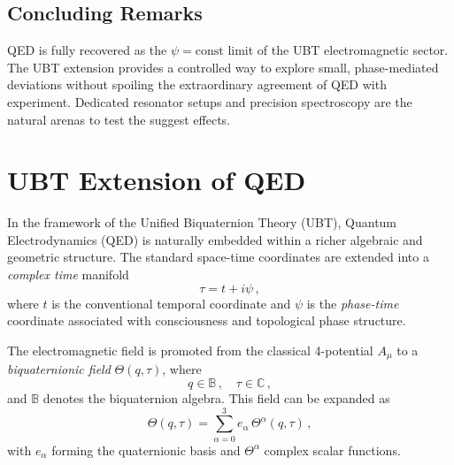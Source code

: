 \subsection*{Concluding Remarks}
QED is fully recovered as the $\psi=\mathrm{const}$ limit of the UBT electromagnetic sector. The UBT extension provides a controlled way to explore small, phase-mediated deviations without spoiling the extraordinary agreement of QED with experiment. Dedicated resonator setups and precision spectroscopy are the natural arenas to test the suggest effects.

\section{UBT Extension of QED}

In the framework of the Unified Biquaternion Theory (UBT), Quantum Electrodynamics (QED) is naturally embedded within a richer algebraic and geometric structure. The standard space-time coordinates are extended into a \emph{complex time} manifold
\begin{equation}
\tau = t + i \psi \,,
\end{equation}
where \(t\) is the conventional temporal coordinate and \(\psi\) is the \emph{phase-time} coordinate associated with consciousness and topological phase structure.  

The electromagnetic field is promoted from the classical 4-potential \(A_\mu\) to a \emph{biquaternionic field} \(\Theta(q,\tau)\), where
\begin{equation}
q \in \mathbb{B} \,, \quad \tau \in \mathbb{C} \,,
\end{equation}
and \(\mathbb{B}\) denotes the biquaternion algebra. This field can be expanded as
\begin{equation}
\Theta(q,\tau) = \sum_{\alpha=0}^3 e_\alpha \, \Theta^\alpha(q,\tau) \,,
\end{equation}
with \(e_\alpha\) forming the quaternionic basis and \(\Theta^\alpha\) complex scalar functions.

